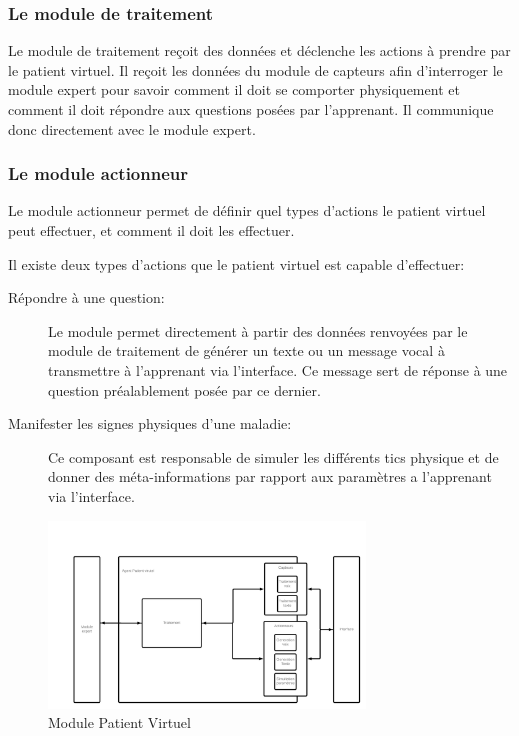     \subsubsection{Le module de traitement}
    Le module de traitement reçoit des données et déclenche les actions à prendre par le patient virtuel. Il reçoit les données du module de capteurs afin d'interroger le module expert pour savoir comment il doit se comporter physiquement et comment il doit répondre aux questions posées par l'apprenant. Il communique donc directement avec le module expert.
    
    \subsubsection{Le module actionneur}
    Le module actionneur permet de définir quel types d'actions le patient virtuel peut effectuer, et comment il doit les effectuer.
    
    Il existe deux types d'actions que le patient virtuel est capable d'effectuer:
    \begin{description}
        \item[Répondre à une question:] Le module permet directement à partir des données renvoyées par le module de traitement de générer un texte ou un message vocal à transmettre à l'apprenant via l'interface. Ce message sert de réponse à une question préalablement posée par ce dernier.
        \item[Manifester les signes physiques d'une maladie:] Ce composant est responsable de simuler les différents tics physique et de donner des méta-informations par rapport aux paramètres a l'apprenant via l'interface.
    \end{description}

    \begin{figure}[H]
        \centering
        \includegraphics[width=0.75\textwidth]{figures/conc-patient virtuel.png}
        \captionsetup{justification=centering}
        \caption{Module Patient Virtuel}
        \label{fig:5}
    \end{figure}
    
